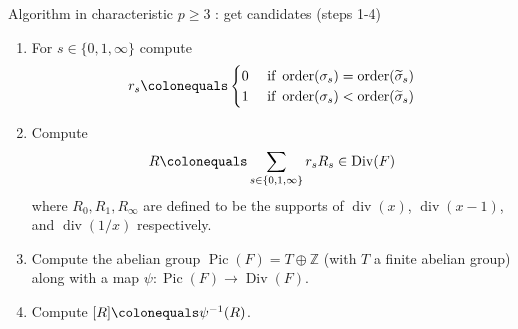 \documentclass[xcolor=dvipsnames]{beamer}
\theoremstyle{plain}
\newcommand{\ZZ}{\mathbb Z}
\newcommand{\wt}[1]{\widetilde{#1}}
\DeclareMathOperator{\Div}{Div}
\DeclareMathOperator{\Pic}{Pic}
\DeclareMathOperator{\ddiv}{div}
\DeclareMathOperator{\order}{order}
\begin{document}
  \begin{frame}{Algorithm in characteristic $p\geq 3$ : get candidates (steps 1-4)}
    \begin{enumerate}
      \item[1.]
        For $s\in\{0,1,\infty\}$
        compute
        \begin{align*}
          r_s\colonequals
          \begin{cases}
            0&
            \text{ if }
            \order(\sigma_s)=
            \order(\wt{\sigma}_s)\\
            1&
            \text{ if }
            \order(\sigma_s)<
            \order(\wt{\sigma}_s)\\
          \end{cases}
        \end{align*}
      \item[2.]
        Compute
        \begin{equation*}
          R\colonequals
          \sum_{s\in\{0,1,\infty\}}r_sR_s
          \in\Div(F)
        \end{equation*}
        where
        $R_0,R_1,R_\infty$
        are defined to be the supports
        of
        $\ddiv(x)$,
        $\ddiv(x-1)$,
        and $\ddiv(1/x)$
        respectively.
      \item[3.]
        Compute the abelian group
        $\Pic(F)=T\oplus\ZZ$
        (with $T$ a finite abelian group)
        along with a map
        $\psi\colon\Pic(F)\to\Div(F)$.
      \item[4.]
        Compute
        $[R]\colonequals\psi^{-1}(R)$.
    \end{enumerate}
  \end{frame}
\end{document}
